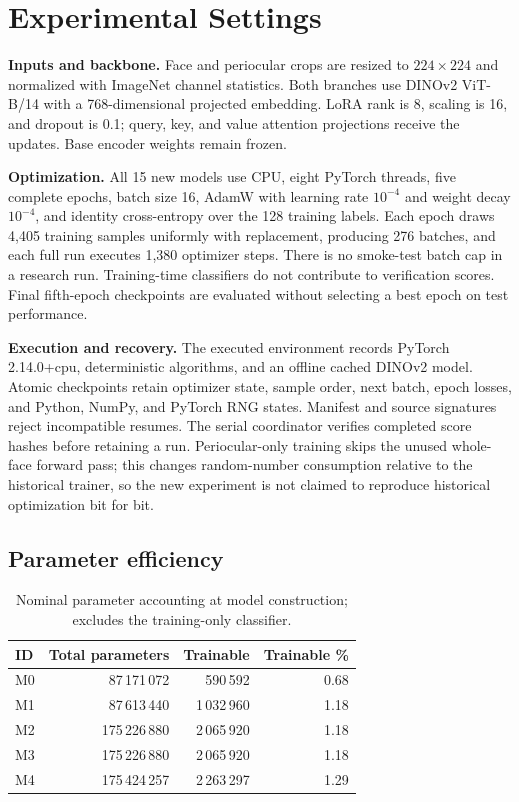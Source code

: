 \documentclass[12pt,a4paper,oneside]{report}
\begin{document}
\chapter{Experimental Settings}
\textbf{Inputs and backbone.} Face and periocular crops are resized to $224\times224$ and normalized with ImageNet channel statistics. Both branches use DINOv2 ViT-B/14 with a 768-dimensional projected embedding. LoRA rank is 8, scaling is 16, and dropout is 0.1; query, key, and value attention projections receive the updates. Base encoder weights remain frozen.

\textbf{Optimization.} All 15 new models use CPU, eight PyTorch threads, five complete epochs, batch size 16, AdamW with learning rate $10^{-4}$ and weight decay $10^{-4}$, and identity cross-entropy over the 128 training labels. Each epoch draws 4,405 training samples uniformly with replacement, producing 276 batches, and each full run executes 1,380 optimizer steps. There is no smoke-test batch cap in a research run. Training-time classifiers do not contribute to verification scores. Final fifth-epoch checkpoints are evaluated without selecting a best epoch on test performance.

\textbf{Execution and recovery.} The executed environment records PyTorch 2.14.0+cpu, deterministic algorithms, and an offline cached DINOv2 model. Atomic checkpoints retain optimizer state, sample order, next batch, epoch losses, and Python, NumPy, and PyTorch RNG states. Manifest and source signatures reject incompatible resumes. The serial coordinator verifies completed score hashes before retaining a run. Periocular-only training skips the unused whole-face forward pass; this changes random-number consumption relative to the historical trainer, so the new experiment is not claimed to reproduce historical optimization bit for bit.

\section{Parameter efficiency}

\begin{table}[h]
\centering
\caption{Nominal parameter accounting at model construction; excludes the training-only classifier.}
\label{tab:params}
\begin{tabular}{lrrr}
\toprule
ID & Total parameters & Trainable & Trainable \%\\
\midrule
M0 & 87\,171\,072 & 590\,592 & 0.68\\
M1 & 87\,613\,440 & 1\,032\,960 & 1.18\\
M2 & 175\,226\,880 & 2\,065\,920 & 1.18\\
M3 & 175\,226\,880 & 2\,065\,920 & 1.18\\
M4 & 175\,424\,257 & 2\,263\,297 & 1.29\\
\bottomrule
\end{tabular}
\end{table}
\end{document}

